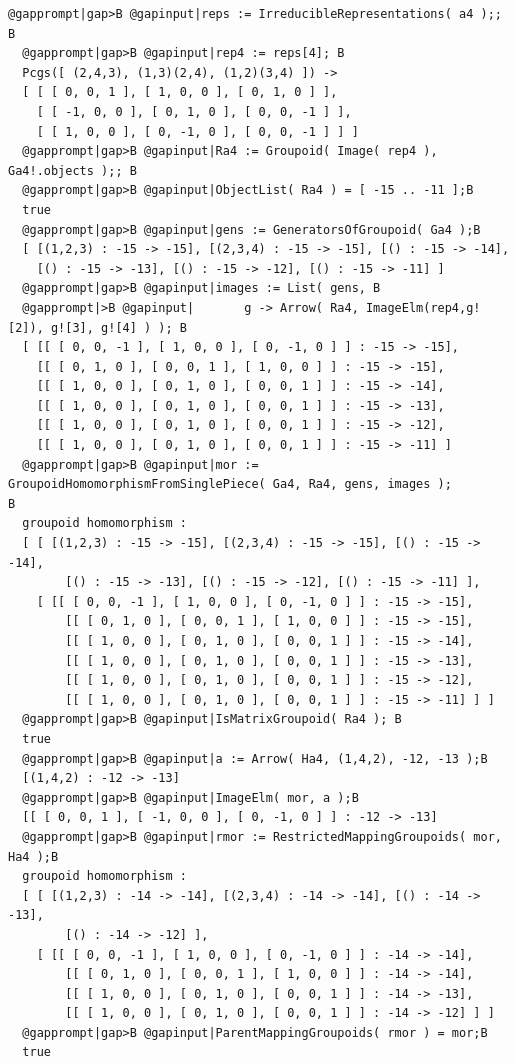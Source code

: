 \documentclass[a4paper,11pt]{report}
\begin{document}
{{\begin{Verbatim}[commandchars=@|B,fontsize=\small,frame=single,label=Example]
  @gapprompt|gap>B @gapinput|reps := IrreducibleRepresentations( a4 );; B
  @gapprompt|gap>B @gapinput|rep4 := reps[4]; B
  Pcgs([ (2,4,3), (1,3)(2,4), (1,2)(3,4) ]) -> 
  [ [ [ 0, 0, 1 ], [ 1, 0, 0 ], [ 0, 1, 0 ] ], 
    [ [ -1, 0, 0 ], [ 0, 1, 0 ], [ 0, 0, -1 ] ], 
    [ [ 1, 0, 0 ], [ 0, -1, 0 ], [ 0, 0, -1 ] ] ]
  @gapprompt|gap>B @gapinput|Ra4 := Groupoid( Image( rep4 ), Ga4!.objects );; B
  @gapprompt|gap>B @gapinput|ObjectList( Ra4 ) = [ -15 .. -11 ];B
  true
  @gapprompt|gap>B @gapinput|gens := GeneratorsOfGroupoid( Ga4 );B
  [ [(1,2,3) : -15 -> -15], [(2,3,4) : -15 -> -15], [() : -15 -> -14],
    [() : -15 -> -13], [() : -15 -> -12], [() : -15 -> -11] ]
  @gapprompt|gap>B @gapinput|images := List( gens, B
  @gapprompt|>B @gapinput|       g -> Arrow( Ra4, ImageElm(rep4,g![2]), g![3], g![4] ) ); B
  [ [[ [ 0, 0, -1 ], [ 1, 0, 0 ], [ 0, -1, 0 ] ] : -15 -> -15], 
    [[ [ 0, 1, 0 ], [ 0, 0, 1 ], [ 1, 0, 0 ] ] : -15 -> -15], 
    [[ [ 1, 0, 0 ], [ 0, 1, 0 ], [ 0, 0, 1 ] ] : -15 -> -14], 
    [[ [ 1, 0, 0 ], [ 0, 1, 0 ], [ 0, 0, 1 ] ] : -15 -> -13], 
    [[ [ 1, 0, 0 ], [ 0, 1, 0 ], [ 0, 0, 1 ] ] : -15 -> -12], 
    [[ [ 1, 0, 0 ], [ 0, 1, 0 ], [ 0, 0, 1 ] ] : -15 -> -11] ]
  @gapprompt|gap>B @gapinput|mor := GroupoidHomomorphismFromSinglePiece( Ga4, Ra4, gens, images );
B
  groupoid homomorphism : 
  [ [ [(1,2,3) : -15 -> -15], [(2,3,4) : -15 -> -15], [() : -15 -> -14], 
        [() : -15 -> -13], [() : -15 -> -12], [() : -15 -> -11] ], 
    [ [[ [ 0, 0, -1 ], [ 1, 0, 0 ], [ 0, -1, 0 ] ] : -15 -> -15], 
        [[ [ 0, 1, 0 ], [ 0, 0, 1 ], [ 1, 0, 0 ] ] : -15 -> -15], 
        [[ [ 1, 0, 0 ], [ 0, 1, 0 ], [ 0, 0, 1 ] ] : -15 -> -14], 
        [[ [ 1, 0, 0 ], [ 0, 1, 0 ], [ 0, 0, 1 ] ] : -15 -> -13], 
        [[ [ 1, 0, 0 ], [ 0, 1, 0 ], [ 0, 0, 1 ] ] : -15 -> -12], 
        [[ [ 1, 0, 0 ], [ 0, 1, 0 ], [ 0, 0, 1 ] ] : -15 -> -11] ] ]
  @gapprompt|gap>B @gapinput|IsMatrixGroupoid( Ra4 ); B
  true
  @gapprompt|gap>B @gapinput|a := Arrow( Ha4, (1,4,2), -12, -13 );B
  [(1,4,2) : -12 -> -13]
  @gapprompt|gap>B @gapinput|ImageElm( mor, a );B
  [[ [ 0, 0, 1 ], [ -1, 0, 0 ], [ 0, -1, 0 ] ] : -12 -> -13]
  @gapprompt|gap>B @gapinput|rmor := RestrictedMappingGroupoids( mor, Ha4 );B
  groupoid homomorphism : 
  [ [ [(1,2,3) : -14 -> -14], [(2,3,4) : -14 -> -14], [() : -14 -> -13], 
        [() : -14 -> -12] ], 
    [ [[ [ 0, 0, -1 ], [ 1, 0, 0 ], [ 0, -1, 0 ] ] : -14 -> -14], 
        [[ [ 0, 1, 0 ], [ 0, 0, 1 ], [ 1, 0, 0 ] ] : -14 -> -14], 
        [[ [ 1, 0, 0 ], [ 0, 1, 0 ], [ 0, 0, 1 ] ] : -14 -> -13], 
        [[ [ 1, 0, 0 ], [ 0, 1, 0 ], [ 0, 0, 1 ] ] : -14 -> -12] ] ]
  @gapprompt|gap>B @gapinput|ParentMappingGroupoids( rmor ) = mor;B
  true
  

\end{Verbatim}}}
\end{document}
